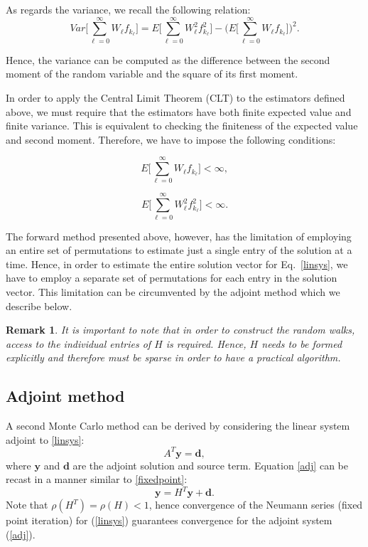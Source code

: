 \documentclass[final,leqno,onefignum,onetabnum]{siamltex1213}
\newtheorem{rem}{Remark}
\begin{document}
As regards the variance, we recall the following relation:
\begin{equation}
Var\bigg [\sum_{\ell=0}^\infty W_{\ell}
f_{k_{\ell}}\bigg]=E\bigg[\sum_{\ell=0}^\infty W_{\ell}^2
f_{k_{\ell}}^2\bigg] - \bigg (E\bigg[\sum_{\ell=0}^\infty W_{\ell}
f_{k_{\ell}}\bigg]\bigg )^2.
\label{dir_var}
\end{equation}

Hence, the variance can be computed as the difference between the second
moment of the random variable and the square of its first moment.\newline

In order to apply the Central Limit Theorem (CLT) to the estimators defined
above, we must require that
the estimators have both finite expected value and finite variance. This is
equivalent to
checking the finiteness of the expected value and second moment.
Therefore, we have to impose the following conditions:

\begin{equation}
 E\bigg[\sum_{\ell=0}^\infty W_{\ell} f_{k_{\ell}}\bigg]<\infty,
\end{equation}

\begin{equation}
 E\bigg[\sum_{\ell=0}^\infty W_{\ell}^2
f_{k_{\ell}}^2\bigg]<\infty .
\end{equation}

The forward method presented above, however, has the limitation of employing an
entire set of permutations to estimate just a single entry of
the solution at a time. Hence, in order to estimate the entire solution
vector for Eq.~\eqref{linsys}, we have to employ a separate set of
permutations for each entry in the solution vector. This limitation
can be circumvented by the adjoint method which we describe below.

\begin{rem}
It is important to note that in order to construct the random walks, 
access to the individual entries of $H$ is required. Hence, $H$ needs to be formed explicitly
and therefore must be sparse in order to have a practical algorithm.
\end{rem}

\subsection{Adjoint method}
\label{subsec:adjoint}

A second Monte Carlo method can be derived by considering the linear system
adjoint to \eqref{linsys}:
\begin{equation}
A^T\mathbf{y}=\mathbf{d},
\label{adj}
\end{equation}
where $\mathbf{y}$ and $\mathbf{d}$ are the adjoint solution and source term.
Equation \eqref{adj} can be recast in a manner similar to \eqref{fixedpoint}:
\[
\mathbf{y} = H^T \mathbf{y} + \mathbf{d}.
\]
Note that $\rho(H^T) = \rho(H) <1$, hence convergence of the Neumann series
(fixed point iteration) for (\ref{linsys}) guarantees convergence
for the adjoint system (\ref{adj}).
\end{document}

